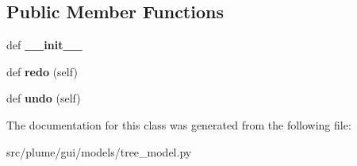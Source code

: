\subsection*{Public Member Functions}
\begin{DoxyCompactItemize}
\item 
def {\bfseries \+\_\+\+\_\+init\+\_\+\+\_\+}\hypertarget{classplume-creator_1_1src_1_1plume_1_1gui_1_1models_1_1tree__model_1_1_delete_command_adf965047efa9a313c77a8433e98e9967}{}\label{classplume-creator_1_1src_1_1plume_1_1gui_1_1models_1_1tree__model_1_1_delete_command_adf965047efa9a313c77a8433e98e9967}

\item 
def {\bfseries redo} (self)\hypertarget{classplume-creator_1_1src_1_1plume_1_1gui_1_1models_1_1tree__model_1_1_delete_command_a0f9813b3e92f77cb4118911b7ec83023}{}\label{classplume-creator_1_1src_1_1plume_1_1gui_1_1models_1_1tree__model_1_1_delete_command_a0f9813b3e92f77cb4118911b7ec83023}

\item 
def {\bfseries undo} (self)\hypertarget{classplume-creator_1_1src_1_1plume_1_1gui_1_1models_1_1tree__model_1_1_delete_command_a406c13f8244d339b695009044fa38824}{}\label{classplume-creator_1_1src_1_1plume_1_1gui_1_1models_1_1tree__model_1_1_delete_command_a406c13f8244d339b695009044fa38824}

\end{DoxyCompactItemize}


The documentation for this class was generated from the following file\+:\begin{DoxyCompactItemize}
\item 
src/plume/gui/models/tree\+\_\+model.\+py\end{DoxyCompactItemize}
